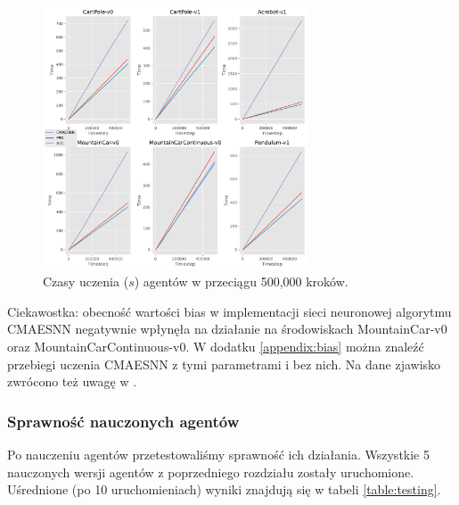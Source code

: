 \documentclass[12pt,a4paper]{article}
\begin{document}
\begin{figure}[!h]
  \centering
  \includegraphics[width=0.7\textwidth]{../plotting/plots/plot_time0.pdf}
  \caption{Czasy uczenia ($s$) agentów w przeciągu 500,000 kroków.}
  \label{fig:training_time}
\end{figure}

\pagebreak
Ciekawostka: obecność wartości bias w implementacji sieci neuronowej
algorytmu CMAESNN negatywnie wpłynęła na działanie na środowiskach
MountainCar-v0 oraz MountainCarContinuous-v0. W dodatku \ref{appendix:bias}
można znaleźć przebiegi uczenia CMAESNN z tymi parametrami i bez nich.
Na dane zjawisko zwrócono też uwagę w \cite{analyzing_reinforcement}.

\subsubsection{Sprawność nauczonych agentów}

Po nauczeniu agentów przetestowaliśmy sprawność ich działania.
Wszystkie 5 nauczonych wersji agentów z poprzedniego rozdziału zostały
uruchomione. Uśrednione (po 10 uruchomieniach) wyniki znajdują się w tabeli
\ref{table:testing}.
\end{document}
